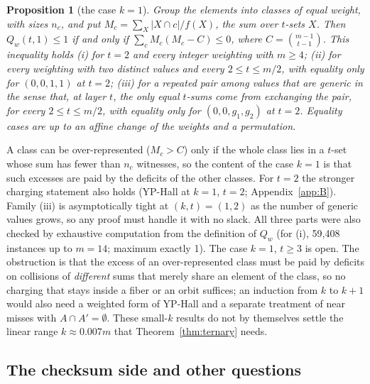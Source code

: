 \documentclass[11pt]{article}
\theoremstyle{plain}
\newtheorem{proposition}{Proposition}
\begin{document}
\begin{proposition}[the case $k = 1$]\label{prop:k1}
Group the elements into classes of equal weight, with sizes $n_c$, and put $M_c = \sum_X |X \cap c|/f(X)$, the sum over $t$-sets $X$. Then $Q_w(t,1) \le 1$ if and only if $\sum_c M_c (M_c - C) \le 0$, where $C = \binom{m-1}{t-1}$. This inequality holds
(i) for $t = 2$ and every integer weighting with $m \ge 4$;
(ii) for every weighting with two distinct values and every $2 \le t \le m/2$, with equality only for $(0,0,1,1)$ at $t = 2$;
(iii) for a repeated pair among values that are generic in the sense that, at layer $t$, the only equal $t$-sums come from exchanging the pair, for every $2 \le t \le m/2$, with equality only for $(0,0,g_1,g_2)$ at $t = 2$.
Equality cases are up to an affine change of the weights and a permutation.
\end{proposition}
A class can be over-represented ($M_c > C$) only if the whole class lies in a $t$-set whose sum has fewer than $n_c$ witnesses, so the content of the case $k = 1$ is that such excesses are paid by the deficits of the other classes. For $t = 2$ the stronger charging statement also holds (YP-Hall at $k = 1$, $t = 2$; Appendix~\ref{app:B}). Family (iii) is asymptotically tight at $(k,t) = (1,2)$ as the number of generic values grows, so any proof must handle it with no slack. All three parts were also checked by exhaustive computation from the definition of $Q_w$ (for (i), 59,408 instances up to $m = 14$; maximum exactly 1). The case $k = 1$, $t \ge 3$ is open. The obstruction is that the excess of an over-represented class must be paid by deficits on collisions of \emph{different} sums that merely share an element of the class, so no charging that stays inside a fiber or an orbit suffices; an induction from $k$ to $k + 1$ would also need a weighted form of YP-Hall and a separate treatment of near misses with $A \cap A' = \emptyset$. These small-$k$ results do not by themselves settle the linear range $k \approx 0.007m$ that Theorem~\ref{thm:ternary} needs.

\subsection*{The checksum side and other questions}
\end{document}
